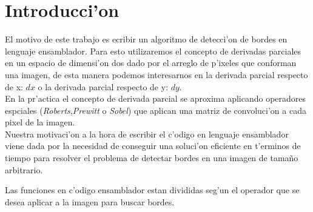 \documentclass[11pt]{article}
\begin{document}
\section{Introducci'on}
El motivo de este trabajo es ecribir un algoritmo de detecci'on de bordes en lenguaje ensamblador.  Para esto utilizaremos el concepto de derivadas parciales en un espacio de dimensi'on dos dado por el arreglo de p'ixeles que conforman una imagen, de esta manera podemos interesarnos en la derivada parcial respecto de x: $dx$ o la derivada parcial respecto de y: $dy$.\\
En la pr'actica el concepto de derivada parcial se aproxima aplicando operadores espciales (\emph{Roberts},\emph{Prewitt} o \emph{Sobel}) que aplican una matriz de convoluci'on a cada pixel de la imagen.\\
Nuestra motivaci'on a la hora de escribir el c'odigo en lenguaje ensamblador viene dada por la necesidad de conseguir una soluci'on eficiente en t'erminos de tiempo para resolver el problema de detectar bordes en una imagen de tama\~{n}o arbitrario. \\
\begin{center}
\begin{minipage}{11cm}
 Las funciones en c'odigo ensamblador estan divididas seg'un el operador que se desea aplicar a la imagen para buscar bordes.
\end{minipage}
\end{center}
\end{document}
